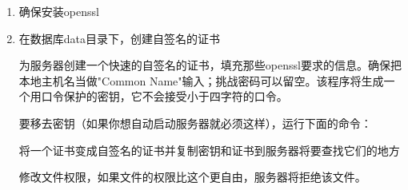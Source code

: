 \documentclass[letterpaper,10pt,english]{sphinxmanual}
\begin{document}
\begin{enumerate}
%
\item {} 
确保安装openssl

\item {} 
在数据库data目录下，创建自签名的证书

为服务器创建一个快速的自签名的证书，填充那些openssl要求的信息。确保把本地主机名当做"Common Name"输入；挑战密码可以留空。该程序将生成一个用口令保护的密钥，它不会接受小于四字符的口令。

\begin{sphinxVerbatim}[commandchars=\\\{\}]
     
\end{sphinxVerbatim}

要移去密钥（如果你想自动启动服务器就必须这样），运行下面的命令：

\begin{sphinxVerbatim}[commandchars=\\\{\}]
     
 
\end{sphinxVerbatim}

将一个证书变成自签名的证书并复制密钥和证书到服务器将要查找它们的地方

\begin{sphinxVerbatim}[commandchars=\\\{\}]
           
\end{sphinxVerbatim}

修改文件权限，如果文件的权限比这个更自由，服务器将拒绝该文件。

\begin{sphinxVerbatim}[commandchars=\\\{\}]
  
\end{sphinxVerbatim}


\end{enumerate}
\end{document}
